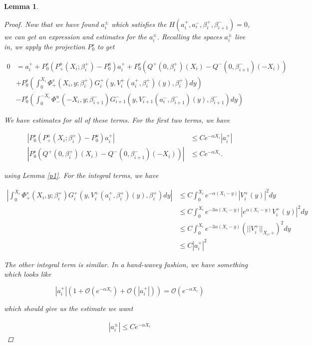 \documentclass[12pt]{article}
\newtheorem{lemma}{Lemma}
\begin{document}
\begin{lemma}
\begin{proof}
Now that we have found $a_i^\pm$ which satisfies the $H(a_i^+, a_i^-, \beta_i^+, \beta_{i+1}^-) = 0$, we can get an expression and estimates for the $a_i^\pm$. Recalling the spaces $a_i^\pm$ live in, we apply the projection $P^s_0$ to get

\begin{align*}
0 &= a_i^+ + P^s_0(P^u_+(X_i; \beta_i^+) -  P^u_0)a_i^+ 
+ P^s_0 \left( Q^+(0, \beta_i^+)(X_i) - Q^-(0, \beta_{i+1}^-)(-X_i) \right)\\
&+ P^s_0 \left( \int_0^{X_i} \Phi_+^s(X_i, y; \beta_i^+) G_i^+(y, V_i^+(a_i^+, \beta_i^+)(y),\beta_i^+)dy \right) \\
&- P^s_0 \left( \int_0^{-X_i} \Phi_-^u(-X_i, y; \beta_{i+1}^-) G_{i+1}^-(y, V_{i+1}^-(a_i^-, \beta_{i+1}^-)(y),\beta_{i+1}^-) dy \right)
\end{align*}

We have estimates for all of these terms. For the first two terms, we have

\begin{align*}
|P^s_0(P^u_+(X_i; \beta_i^+) -  P^u_0)a_i^+ | &\leq C e^{-\alpha X_i} |a_i^+| \\
|P^s_0 \left( Q^+(0, \beta_i^+)(X_i) - Q^-(0, \beta_{i+1}^-)(-X_i) \right)| &\leq C e^{-\alpha X_i}.
\end{align*}

using Lemma \ref{p1}. For the integral terms, we have

\begin{align*}
\left| \int_0^{X_i} \Phi_+^s(X_i, y; \beta_i^+) G_i^+(y, V_i^+(a_i^+, \beta_i^+)(y),\beta_i^+)dy \right| &\leq C \int_0^{X_i}e^{-\alpha(X_i - y)} |V_i^+(y)|^2 dy \\
&\leq C \int_0^{X_i}e^{-3 \alpha (X_i - y)} |e^{\alpha(X_i - y)} V_i^+(y)|^2 dy \\
&\leq C \int_0^{X_i}e^{-3 \alpha (X_i - y)} (||V_i^+||_{X_i, +})^2 dy \\
&\leq C |a_i^+|^2
\end{align*}

The other integral term is similar. In a hand-wavey fashion, we have something which looks like

\[
|a_i^+|(1 + \mathcal{O}(e^{-\alpha X_i}) + \mathcal{O}(|a_i^+|)) = 
\mathcal{O}( e^{-\alpha X_i} )
\]

which should give us the estimate we want

\begin{align*}
|a_i^\pm| \leq C e^{-\alpha X_i}
\end{align*}


\end{proof}
\end{lemma}
\end{document}
